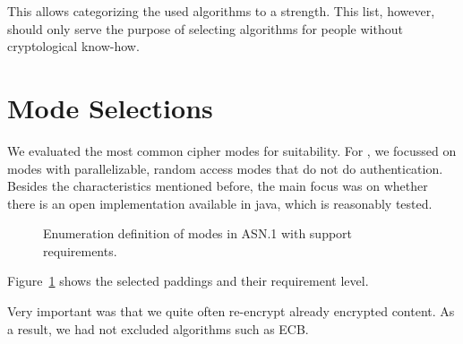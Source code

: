 This allows categorizing the used algorithms to a strength. This list, however, should only serve the purpose of selecting algorithms for people without cryptological know-how.

\section{Mode Selections}
We evaluated the most common cipher modes for suitability. For \MessageVortex, we focussed on modes with parallelizable, random access modes that do not do authentication. Besides the characteristics mentioned before, the main focus was on whether there is an open implementation available in java, which is reasonably tested.

\begin{figure}[ht]
	
	\caption{Enumeration definition of modes in ASN.1 with support requirements.}
	\label{fig:defModes}
\end{figure}

Figure~\ref{fig:defModes} shows the selected paddings and their requirement level.

Very important was that we quite often re-encrypt already encrypted content. As a result, we had not excluded algorithms such as ECB.

